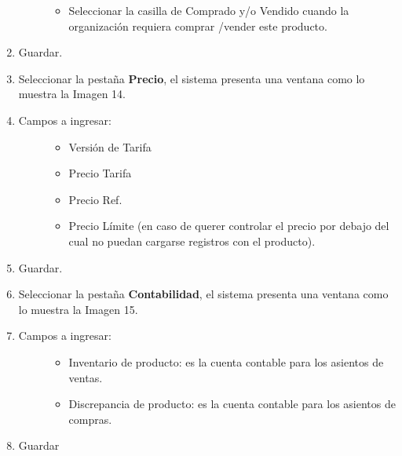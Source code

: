 \documentclass[letterpaper,10pt,spanish]{sphinxmanual}
\begin{document}
\begin{enumerate}
\begin{description}
\begin{itemize}
\item {} 
Seleccionar la casilla de Comprado y/o Vendido cuando la organización requiera comprar /vender este producto.

\end{itemize}

\end{description}

\item {} 
Guardar.

\item {} 
Seleccionar la pestaña \textbf{Precio}, el sistema presenta una ventana como lo muestra la Imagen 14.

\item {} \begin{description}
\item[{Campos a ingresar:}] \leavevmode\begin{itemize}
\item {} 
Versión de Tarifa

\item {} 
Precio Tarifa

\item {} 
Precio        Ref.

\item {} 
Precio Límite (en caso de querer controlar el precio por debajo del cual no puedan cargarse registros con el producto).

\end{itemize}

\end{description}

\item {} 
Guardar.

\item {} 
Seleccionar la pestaña \textbf{Contabilidad}, el sistema presenta una ventana como lo muestra la Imagen 15.

\item {} \begin{description}
\item[{Campos a ingresar:}] \leavevmode\begin{itemize}
\item {} 
Inventario de producto: es la cuenta contable para los asientos de ventas.

\item {} 
Discrepancia de producto: es la cuenta contable para los asientos de compras.

\end{itemize}

\end{description}

\item {} 
Guardar

\end{enumerate}
\end{document}
